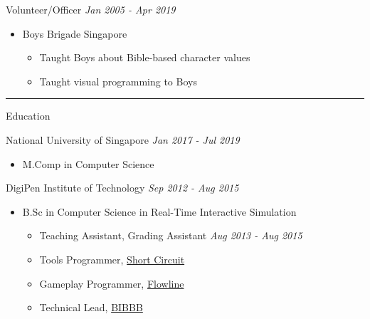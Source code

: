\documentclass[letterpaper,11pt]{article}
\newcommand{\cvtitle}[1]{\huge\raggedright \textcolor{section_color}{#1}\\}
\newcommand{\cvhead}[1]{\large\raggedright \textcolor{subsection_color}{#1}\\}
\newcommand{\cvlist}[1]{\vspace{-12pt}\small \textcolor{item_color}{\begin{itemize}#1\end{itemize}}}
\newcommand{\cvli}[1]{\vspace{-4pt} \item{#1}}
\newcommand{\cvline}[0]{\noindent\rule{19cm}{0.4pt}}
\newcommand{\link}[2]{\textcolor{link_color}{\href{#1}{#2}}}
\newcommand{\qualifier}[1]{\hfill \textsl{\footnotesize #1}}
\begin{document}
\cvhead{Volunteer/Officer \qualifier{Jan 2005 - Apr 2019}}
\cvlist{
    \cvli{
        \cvhead{Boys Brigade Singapore}
        \cvlist{
            \cvli{Taught Boys about Bible-based character values}
            \cvli{Taught visual programming to Boys}
        }
    }
}

\vspace{-12pt}

\cvline

\cvtitle{Education}
\cvhead{National University of Singapore \qualifier{Jan 2017 - Jul 2019}}
\cvlist{
    \cvli{
        \cvhead{M.Comp in Computer Science}
    }
}

\cvhead{DigiPen Institute of Technology \qualifier{Sep 2012 - Aug 2015}}
\cvlist{
    \cvli{
        \cvhead{B.Sc in Computer Science in Real-Time Interactive Simulation}
        \cvlist{
            \cvli{Teaching Assistant, Grading Assistant \qualifier{Aug 2013 - Aug 2015}}
            \cvli{Tools Programmer, \link{http://games.digipen.edu/games/shortcircuit}{Short Circuit}}
            \cvli{Gameplay Programmer, \link{http://games.digipen.edu/games/flowline}{Flowline}}
            \cvli{Technical Lead, \link{http://games.digipen.edu/games/bibbb}{BIBBB}}
        }
    }
}
\end{document}
